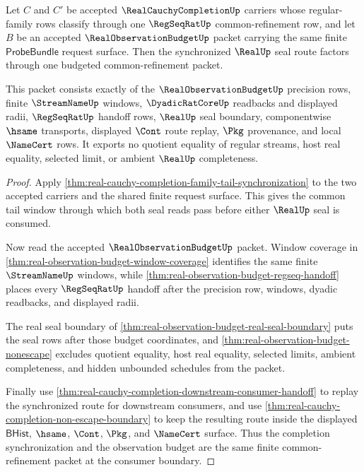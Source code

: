 \begin{theorem}
\label{thm:real-cauchy-completion-budgeted-common-refinement}
Let $C$ and $C'$ be accepted $\RealCauchyCompletionUp$ carriers whose regular-family rows classify through one $\RegSeqRatUp$ common-refinement row, and let $B$ be an accepted $\RealObservationBudgetUp$ packet carrying the same finite $\mathsf{ProbeBundle}$ request surface. Then the synchronized $\RealUp$ seal route factors through one budgeted common-refinement packet.

This packet consists exactly of the $\RealObservationBudgetUp$ precision rows, finite $\StreamNameUp$ windows, $\DyadicRatCoreUp$ readbacks and displayed radii, $\RegSeqRatUp$ handoff rows, $\RealUp$ seal boundary, componentwise $\hsame$ transports, displayed $\Cont$ route replay, $\Pkg$ provenance, and local $\NameCert$ rows. It exports no quotient equality of regular streams, host real equality, selected limit, or ambient $\RealUp$ completeness.
\end{theorem}
\begin{proof}
Apply \autoref{thm:real-cauchy-completion-family-tail-synchronization} to the two accepted carriers and the shared finite request surface. This gives the common tail window through which both seal reads pass before either $\RealUp$ seal is consumed.

Now read the accepted $\RealObservationBudgetUp$ packet. Window coverage in \autoref{thm:real-observation-budget-window-coverage} identifies the same finite $\StreamNameUp$ windows, while \autoref{thm:real-observation-budget-regseq-handoff} places every $\RegSeqRatUp$ handoff after the precision row, windows, dyadic readbacks, and displayed radii.

The real seal boundary of \autoref{thm:real-observation-budget-real-seal-boundary} puts the seal rows after those budget coordinates, and \autoref{thm:real-observation-budget-nonescape} excludes quotient equality, host real equality, selected limits, ambient completeness, and hidden unbounded schedules from the packet.

Finally use \autoref{thm:real-cauchy-completion-downstream-consumer-handoff} to replay the synchronized route for downstream consumers, and use \autoref{thm:real-cauchy-completion-non-escape-boundary} to keep the resulting route inside the displayed $\mathsf{BHist}$, $\hsame$, $\Cont$, $\Pkg$, and $\NameCert$ surface. Thus the completion synchronization and the observation budget are the same finite common-refinement packet at the consumer boundary.
\end{proof}

